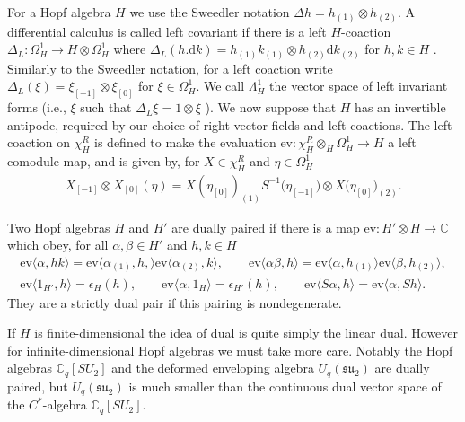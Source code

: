 \documentclass[10pt,a4paper]{amsart}
\numberwithin{equation}{section}
\newcommand{\ev}{\mathrm{ev}}
\newcommand{\extd}{\mathrm{d}}
\newcommand{\tens}{\mathop{\otimes}}
\newcommand{\C}{\mathbb{C}}
\newcommand{\<}{\langle}
\renewcommand{\>}{\rangle}
\begin{document}
For a Hopf algebra $ H $ we use the Sweedler notation $ \Delta h =h_{(1)}\tens h_{(2)}$. A differential calculus is called left covariant if there is a left $ H $-coaction $ \Delta_{L}\colon \Omega_{H}^{1} \rightarrow H \tens \Omega_{H}^{1} $ where $ \Delta_{L} (h. \extd k)= h_{(1)} k_{(1)} \tens h_{(2)} \extd k_{(2)} $ for $ h,k \in H $ \cite{WoroCal}. Similarly to the Sweedler notation, for a left coaction write $ \Delta_{L} (\xi)=\xi_{[-1]}\tens \xi_{[0]}$ for $ \xi \in \Omega_{H}^{1} $. We call $\Lambda_{H}^{1} $ the vector space of left invariant forms (i.e., $ \xi $ such that $\Delta_{L} \xi= 1 \tens \xi$ ). We now suppose that $ H $ has an invertible antipode, required by our choice of right vector fields and left coactions. The left coaction on $ \chi^{R}_H $ is defined to make the evaluation $ \ev\colon \chi^{R} _H \tens_{H} \Omega_{H}^{1}\rightarrow H$ a left comodule map, and is given by, for $ X \in \chi^{R}_H $ and $ \eta \in \Omega_{H}^{1}$
\begin{gather*}
	X_{[-1]}\tens X_{[0]} (\eta)=X(\eta_{[0]})_{(1)} S^{-1}\big(\eta_{[-1]}\big) \tens X\big(\eta_{[0]}\big)_{(2)}.
\end{gather*}
\begin{Definition}\label{D1}
	Two Hopf algebras $ H $ and $ H' $ are dually paired if there is a map $ \ev \colon H' \tens H\allowbreak \rightarrow \C $ which obey, for all $ \alpha, \beta \in H' $ and $ h,k \in H $
	\begin{gather*}
	\ev \langle \alpha, h k \rangle =\ev \langle \alpha_{(1)}, h, \rangle \ev \langle \alpha_{(2)}, k \rangle, \qquad \ev \langle \alpha \beta, h \rangle =\ev \langle \alpha, h_{(1)} \rangle \ev \langle \beta, h_{(2)} \rangle,\\
	\ev \langle 1_{H'}, h \rangle = \epsilon _{H} (h), \qquad \ev \langle \alpha, 1_{H} \rangle = \epsilon _{H'} (h), \qquad \ev \langle S \alpha, h\rangle =\ev \langle \alpha, S h\rangle.
	\end{gather*}
They are a strictly dual pair if this pairing is nondegenerate.

If $ H $ is finite-dimensional the idea of dual is quite simply the linear dual. However for infinite-dimensional Hopf algebras we must take more care. Notably the Hopf algebras $ \C_{q}[SU_{2}] $ and the deformed enveloping algebra $ U_{q}({\mathfrak{su}}_{2}) $ are dually paired, but $ U_{q}({\mathfrak{su}}_{2}) $ is much smaller than the continuous dual vector space of the $ C^{*} $-algebra $ \C_{q}[SU_{2}] $.
\end{Definition}
\end{document}
